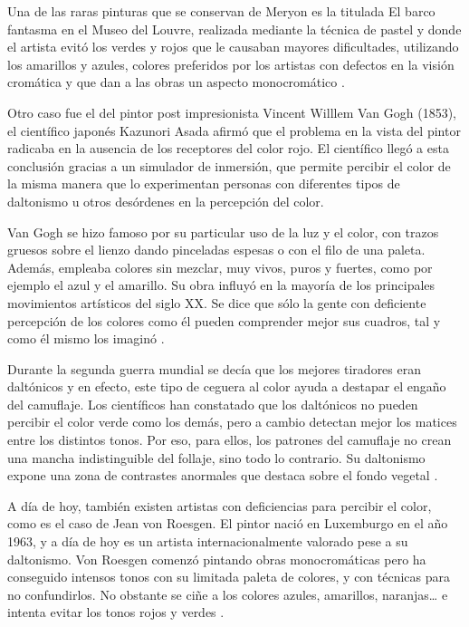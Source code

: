 \documentclass[10pt]{article}
\begin{document}
\setlength{\parskip}{2mm}

Una de las raras pinturas que se conservan de Meryon es la titulada El barco fantasma en el Museo del Louvre, realizada mediante la técnica de pastel y donde el artista evitó los verdes y rojos que le causaban mayores dificultades, utilizando los amarillos y azules, colores preferidos por los artistas con defectos en la visión cromática y que dan a las obras un aspecto monocromático \cite{IEEEreferencias:Ref5}.

\setlength{\parskip}{2mm}

Otro caso fue el del  pintor post impresionista Vincent Willlem Van Gogh (1853), el científico japonés Kazunori Asada afirmó que el problema en la vista del pintor radicaba en la ausencia de los receptores del color rojo. El científico llegó a esta conclusión gracias a un simulador de inmersión, que permite percibir el color de la misma manera que lo experimentan personas con diferentes tipos de daltonismo u otros desórdenes en la percepción del color\cite{IEEEreferencias:Ref6}.

\setlength{\parskip}{2mm}

Van Gogh se hizo famoso por su particular uso de la luz y el color, con trazos gruesos sobre el lienzo dando pinceladas espesas o con el filo de una paleta. Además, empleaba colores sin mezclar, muy vivos, puros y fuertes, como por ejemplo el azul y el amarillo. Su obra influyó en la mayoría de los principales movimientos artísticos del siglo XX. Se dice que sólo la gente con deficiente percepción de los colores como él pueden comprender mejor sus cuadros, tal y como él mismo los imaginó \cite{IEEEreferencias:Ref6}.

\setlength{\parskip}{2mm}

Durante la segunda guerra mundial se decía que los mejores tiradores eran daltónicos y en efecto, este tipo de ceguera al color ayuda a destapar el engaño del camuflaje. Los científicos han constatado que los daltónicos no pueden percibir el color verde como los demás, pero a cambio detectan mejor los matices entre los distintos tonos. Por eso, para ellos, los patrones del camuflaje no crean una mancha indistinguible del follaje, sino todo lo contrario. Su daltonismo expone una zona de contrastes anormales que destaca sobre el fondo vegetal \cite{IEEEreferencias:Ref7}.

\setlength{\parskip}{2mm}

A día de hoy, también existen artistas con deficiencias para percibir el color, como es el caso de Jean von Roesgen. El pintor nació en Luxemburgo en el año 1963, y a día de hoy es un artista internacionalmente valorado pese a su daltonismo. Von Roesgen comenzó pintando obras monocromáticas pero ha conseguido intensos tonos con su limitada paleta de colores, y con técnicas para no confundirlos. No obstante se ciñe a los colores azules, amarillos, naranjas… e intenta evitar los tonos rojos y verdes \cite{IEEEreferencias:Ref6}.
\end{document}
